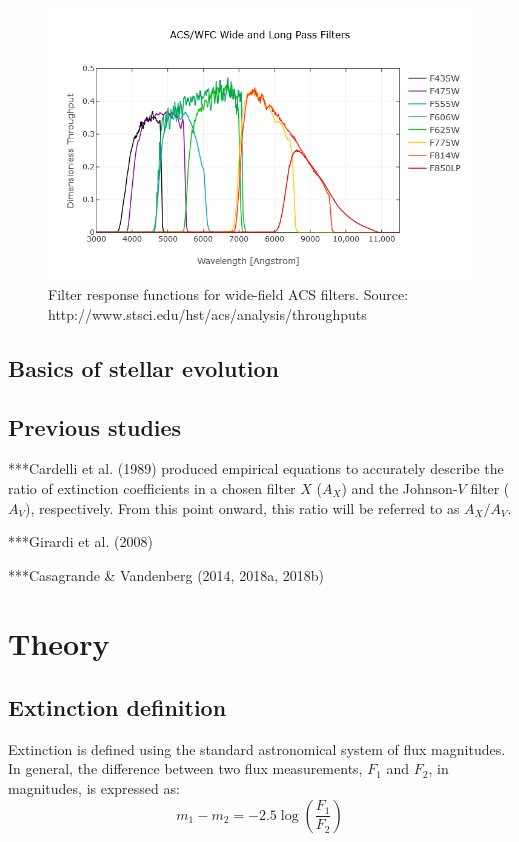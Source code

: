 \documentclass[12pt, a4paper]{report}
\begin{document}
\begin{figure}[h]
\begin{center}
\includegraphics[scale=0.5]{ACS_Wide.png}
\caption{Filter response functions for wide-field ACS filters. Source: http://www.stsci.edu/hst/acs/analysis/throughputs}
\label{ACS_response_funcs}
\end{center}
\end{figure}

\section{Basics of stellar evolution}


\section{Previous studies}
***Cardelli et al. (1989) produced empirical equations to accurately describe the ratio of extinction coefficients in a chosen filter $X$ ($A_{X}$) and the Johnson-$V$ filter ($A_{V}$), respectively. From this point onward, this ratio will be referred to as $A_{X}/A_{V}$.

***Girardi et al. (2008) 

***Casagrande \& Vandenberg (2014, 2018a, 2018b)



\chapter{Theory}
\section{Extinction definition}
Extinction is defined using the standard astronomical system of flux magnitudes. In general, the difference between two flux measurements, $F_{1}$ and $F_{2}$, in magnitudes, is expressed as:
\begin{equation}
\label{mags_def}
m_{1} - m_{2} = -2.5\log \left( \frac{F_{1}}{F_{2}} \right)
\end{equation}
\end{document}
